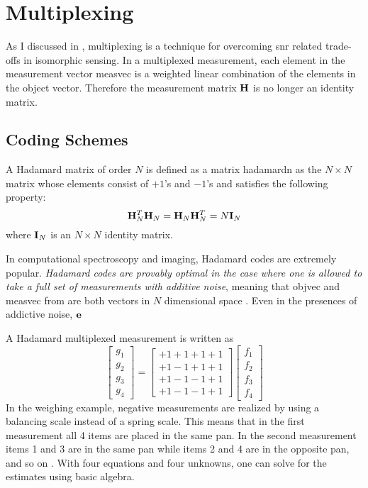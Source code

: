 \section{Multiplexing}

As I discussed in , \gls{multiplexing} is a technique for overcoming \gls{snr} related trade-offs in \gls{isomorphic} sensing. In a multiplexed measurement, each element in the measurement vector \gls{measvec} is a weighted linear combination of the elements in the object vector. Therefore the measurement matrix $\displaystyle \mathbf{H}$ is no longer an identity matrix. 

\subsection{Coding Schemes}\label{subsec:codingschemes}

A Hadamard matrix of order $N$ is defined as a matrix \gls{hadamardn} as the $N \times N$ matrix whose elements consist of $+1$'s and $-1$'s and satisfies the following property:
\begin{equation}
	\displaystyle \mathbf{H}_{N}^T \displaystyle \mathbf{H}_{N} = \displaystyle \mathbf{H}_{N} \displaystyle \mathbf{H}_{N}^T = N \displaystyle \mathbf{I}_{N}
\end{equation}
where $\displaystyle \mathbf{I}_N$ is an $N \times N$ identity matrix. 

In computational spectroscopy and imaging, Hadamard codes are extremely popular. \emph{Hadamard codes are provably optimal in the case where one is allowed to take a full set of measurements with additive noise}, meaning that \gls{objvec} and \gls{measvec} from  are both vectors in $N$ dimensional space \cite{harwit2012hadamard}. Even in the presences of addictive noise, $\displaystyle \mathbf{e}$

A Hadamard multiplexed measurement is written as
%
\begin{equation}
\left[ \begin{matrix} g_{1}\\ g_{2}\\ g_{3}\\ g_{4}\end{matrix} \right] =\left[ \begin{matrix} +1 +1 +1 +1 \\ +1 -1 +1 +1 \\ +1 -1 -1 +1 \\ +1 -1 -1 +1 \end{matrix} \right] \left[ \begin{matrix} f_{1}\\ f_{2}\\ f_{3}\\ f_{4}\end{matrix} \right]
\end{equation}
%
In the weighing example, negative measurements are realized by using a balancing scale instead of a spring scale. This means that in the first measurement all 4 items are placed in the same pan. In the second measurement items 1 and 3 are in the same pan while items 2 and 4 are in the opposite pan, and so on \cite{harwit2012hadamard}. With four equations and four unknowns, one can solve for the estimates using basic algebra.

